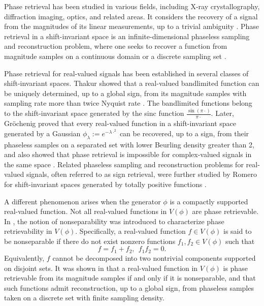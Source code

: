 \documentclass[11pt,oneside,reqno]{amsart}
\numberwithin{equation}{section}
\begin{document}
 Phase retrieval has been studied in  various fields, including X-ray crystallography, diffraction imaging, optics, and related areas.  It considers the recovery of a signal from the magnitudes of its linear measurements, up to a trivial ambiguity \cite{BCE06, bunk2007diffractive, F78,harrison1993phase,HES16,H01,JEH16,millane90,walther1963question}. 
	Phase retrieval in a shift-invariant space is an infinite-dimensional phaseless sampling and reconstruction problem, where one seeks to recover a function from magnitude samples on a continuous domain or a discrete sampling set \cite{Chen2020,Cheng2021,Cheng2019, CS2021, grochenig2020,Romero2018,shenoy2016exact,Thakur11}. 

    Phase retrieval for real-valued signals has been established in several classes of shift-invariant spaces.
Thakur showed that a real-valued bandlimited function can be uniquely determined, up
to a global sign, from its magnitude samples with sampling rate more than twice Nyquist rate \cite{Thakur11}. 
The bandlimited functions belong to the shift-invariant space generated by the sinc
function $\frac{\sin(\pi \cdot)}{\pi \cdot}$. Later, 
Gr\"ochenig proved that every real-valued function in a shift-invariant space
generated by a Gaussian $\phi_\lambda := e^{-\lambda \cdot^2}$ can be recovered, up to
a sign, from their phaseless samples on a separated set with  lower Beurling density greater than 2, and also showed that phase retrieval
is impossible for complex-valued signals in the same space \cite{grochenig2020}. 
Related phaseless sampling and reconstruction problems for real-valued signals, often
referred to as sign retrieval, were further studied by Romero for shift-invariant
spaces generated by totally positive functions \cite{Romero2018}.


A different phenomenon arises when the generator $\phi$ is a compactly supported real-valued function. Not all real-valued functions in $V(\phi)$ are phase retrievable.  In \cite{Chen2020, Cheng2019, CS2021}, the notion of nonseparability was
introduced to characterize phase retrievability in $V(\phi)$.  Specifically, a real-valued function $f\in V(\phi)$ is said to be nonseparable if
there do not exist nonzero functions $f_1,f_2\in V(\phi)$ such that
\[
f = f_1 + f_2, \ \ 
f_1 f_2 = 0.
\]
Equivalently, $f$ cannot be decomposed into two nontrivial components supported on disjoint sets. It was shown in \cite{Chen2020, Cheng2019, CS2021} that a real-valued function in $V(\phi)$ is phase retrievable from its magnitude samples if and only if it is nonseparable, and that such functions admit reconstruction, up to a global sign,
from phaseless samples taken on a discrete set with finite sampling density.
\end{document}
